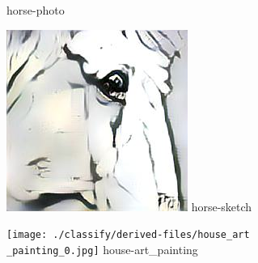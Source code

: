 \documentclass{article}
\begin{document}
\begin{figure}[htp]
\begin{minipage}{0.14285714285714285\linewidth}
        {horse-photo}
    \end{minipage}%
    \begin{minipage}{0.14285714285714285\linewidth}
        \includegraphics[width=\linewidth]{./classify/derived-files/horse_sketch_0.jpg}
        {horse-sketch}
    \end{minipage}%
    \begin{minipage}{0.14285714285714285\linewidth}
        \texttt{[image: ./classify/derived-files/house\_art\\\_painting\_0.jpg]}
        {house-art\_painting}
    \end{minipage}%


\end{figure}
\end{document}

